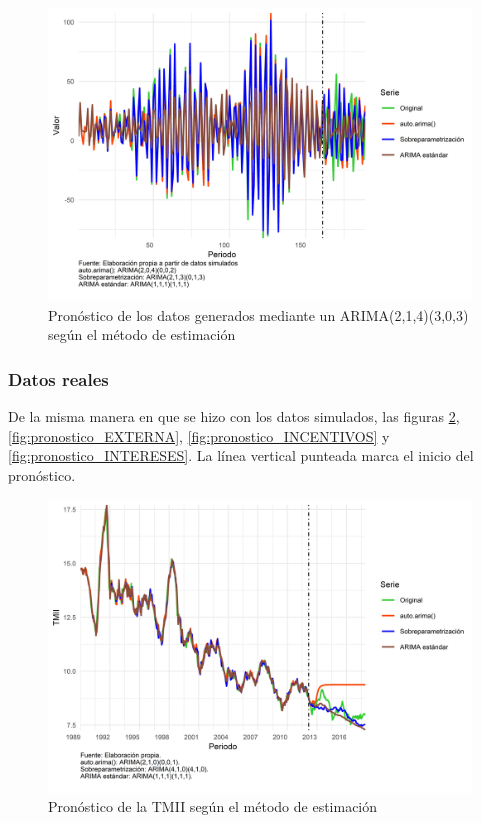 \documentclass[
]{article}
\begin{document}
\begin{figure}[H]
\includegraphics[width=1\linewidth,height=1\textheight]{Tesis_files/figure-latex/pronostico_arima214_303-1} \caption{Pronóstico de los datos generados mediante un ARIMA(2,1,4)(3,0,3) según el método de estimación}\label{fig:pronostico_arima214_303}
\end{figure}

\subsubsection{Datos reales}

De la misma manera en que se hizo con los datos simulados, las figuras
\ref{fig:pronostico_TMII}, \ref{fig:pronostico_EXTERNA},
\ref{fig:pronostico_INCENTIVOS} y \ref{fig:pronostico_INTERESES}. La
línea vertical punteada marca el inicio del pronóstico.

\begin{figure}[H]
\includegraphics[width=1\linewidth,height=1\textheight]{Tesis_files/figure-latex/pronostico_TMII-1} \caption{Pronóstico de la TMII según el método de estimación}\label{fig:pronostico_TMII}
\end{figure}
\end{document}
